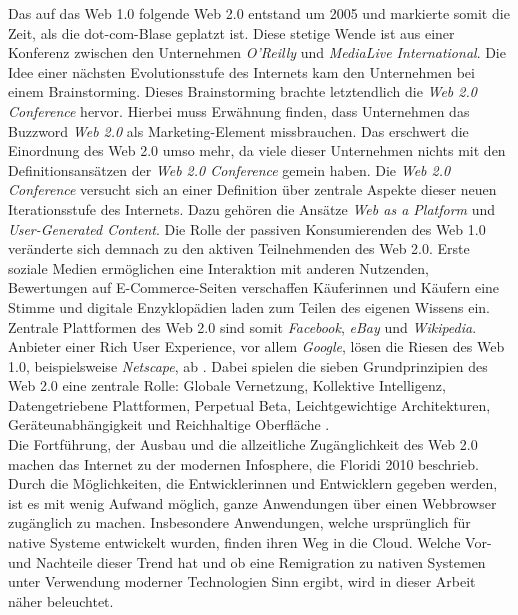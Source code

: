 \documentclass[a4paper]{scrartcl}
\begin{document}
Das auf das Web 1.0 folgende Web 2.0 entstand um 2005 und markierte somit die Zeit, als die dot-com-Blase geplatzt ist. Diese stetige Wende ist aus einer Konferenz zwischen den Unternehmen \textit{O'Reilly} und \textit{MediaLive International}. Die Idee einer nächsten Evolutionsstufe des Internets kam den Unternehmen bei einem Brainstorming. Dieses Brainstorming brachte letztendlich die \textit{Web 2.0 Conference} hervor. Hierbei muss Erwähnung finden, dass Unternehmen das Buzzword \textit{Web 2.0} als Marketing-Element missbrauchen. Das erschwert die Einordnung des Web 2.0 umso mehr, da viele dieser Unternehmen nichts mit den Definitionsansätzen der \textit{Web 2.0 Conference} gemein haben. Die \textit{Web 2.0 Conference} versucht sich an einer Definition über zentrale Aspekte dieser neuen Iterationsstufe des Internets. Dazu gehören die Ansätze \textit{Web as a Platform} und \textit{User-Generated Content}. Die Rolle der passiven Konsumierenden des Web 1.0 veränderte sich demnach zu den aktiven Teilnehmenden des Web 2.0. Erste soziale Medien ermöglichen eine Interaktion mit anderen Nutzenden, Bewertungen auf E-Commerce-Seiten verschaffen Käuferinnen und Käufern eine Stimme und digitale Enzyklopädien laden zum Teilen des eigenen Wissens ein. Zentrale Plattformen des Web 2.0 sind somit \textit{Facebook}, \textit{eBay} und \textit{Wikipedia}. Anbieter einer Rich User Experience, vor allem \textit{Google}, lösen die Riesen des Web 1.0, beispielsweise \textit{Netscape}, ab \autocite{Oreilly}. Dabei spielen die sieben Grundprinzipien des Web 2.0 eine zentrale Rolle: Globale Vernetzung, Kollektive Intelligenz, Datengetriebene Plattformen, Perpetual Beta, Leichtgewichtige Architekturen, Geräteunabhängigkeit und Reichhaltige Oberfläche \autocite[Kollmann und Häsel 2007, zitiert nach][137]{Kollmann}. \\

Die Fortführung, der Ausbau und die allzeitliche Zugänglichkeit des Web 2.0 machen das Internet zu der modernen Infosphere, die Floridi 2010 beschrieb. Durch die Möglichkeiten, die Entwicklerinnen und Entwicklern gegeben werden, ist es mit wenig Aufwand möglich, ganze Anwendungen über einen Webbrowser zugänglich zu machen. Insbesondere Anwendungen, welche ursprünglich für native Systeme entwickelt wurden, finden ihren Weg in die Cloud. Welche Vor- und Nachteile dieser Trend hat und ob eine Remigration zu nativen Systemen unter Verwendung moderner Technologien Sinn ergibt, wird in dieser Arbeit näher beleuchtet. 

\newpage
\end{document}
